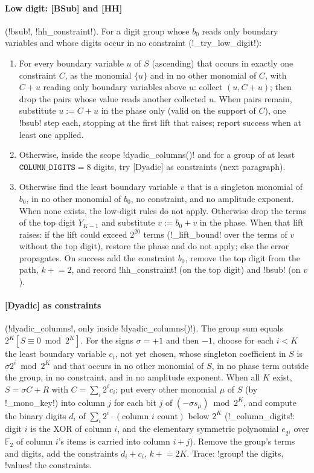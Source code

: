 \paragraph{Low digit: [BSub] and [HH]} (\code!bsub!, \code!hh_constraint!). For a digit group whose $b_0$ reads only boundary variables and whose digits occur in no constraint (\py!_try_low_digit!):
\begin{enumerate}
\item For every boundary variable $u$ of $S$ (ascending) that occurs in exactly one constraint $C$, as the monomial $\{u\}$ and in no other monomial of $C$, with $C+u$ reading only boundary variables above $u$: collect $(u,C+u)$; then drop the pairs whose value reads another collected $u$. When pairs remain, substitute $u:=C+u$ in the phase only (valid on the support of $C$), one \code!bsub! step each, stopping at the first lift that raises; report success when at least one applied.
\item Otherwise, inside the scope \py!dyadic_columns()! and for a group of at least $\mathtt{COLUMN\_DIGITS}=8$ digits, try [Dyadic] as constraints (next paragraph).
\item Otherwise find the least boundary variable $v$ that is a singleton monomial of $b_0$, in no other monomial of $b_0$, no constraint, and no amplitude exponent. When none exists, the low-digit rules do not apply. Otherwise drop the terms of the top digit $Y_{K-1}$ and substitute $v:=b_0+v$ in the phase. When that lift raises: if the lift could exceed $2^{20}$ terms (\py!_lift_bound! over the terms of $v$ without the top digit), restore the phase and do not apply; else the error propagates. On success add the constraint $b_0$, remove the top digit from the path, $k\mathrel{+}=2$, and record \code!hh_constraint! (on the top digit) and \code!bsub! (on $v$).
\end{enumerate}

\paragraph{[Dyadic] as constraints} (\code!dyadic_columns!, only inside \py!dyadic_columns()!). The group sum equals $2^K[S\equiv0\bmod2^K]$. For the signs $\sigma=+1$ and then $-1$, choose for each $i<K$ the least boundary variable $c_i$, not yet chosen, whose singleton coefficient in $S$ is $\sigma2^i\bmod2^K$ and that occurs in no other monomial of $S$, in no phase term outside the group, in no constraint, and in no amplitude exponent. When all $K$ exist, $S=\sigma C+R$ with $C=\sum_i2^ic_i$; put every other monomial $\mu$ of $S$ (by \py!_mono_key!) into column $j$ for each bit $j$ of $(-\sigma s_\mu)\bmod2^K$, and compute the binary digits $d_i$ of $\sum_i2^i\cdot(\text{column }i\text{ count})$ below $2^K$ (\py!_column_digits!: digit $i$ is the XOR of column $i$, and the elementary symmetric polynomial $e_{2^j}$ over $\mathbb{F}_2$ of column $i$'s items is carried into column $i+j$). Remove the group's terms and digits, add the constraints $d_i+c_i$, $k\mathrel{+}=2K$. Trace: \code!group! the digits, \code!values! the constraints.

